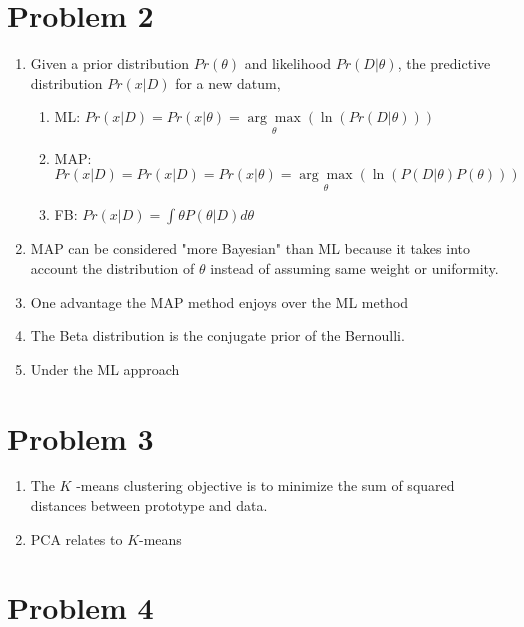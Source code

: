 \documentclass[11pt]{article}
\begin{document}
\section{Problem 2}
\begin{enumerate}
\item Given a prior distribution $Pr(\theta)$ and likelihood $Pr(D|\theta)$, the predictive distribution $Pr(x|D)$ for a new datum, 
	\begin{enumerate}
	\item ML: $Pr(x|D)=Pr(x|\theta)=\underset{\theta}{\arg\max}(\ln(Pr(D|\theta)))$
	\item MAP: $Pr(x|D)=Pr(x|D)=Pr(x|\theta)=\underset{\theta}{\arg\max}(\ln(P(D|\theta)P(\theta)))$
	\item FB: $Pr(x|D)=\int \theta P(\theta|D)d\theta$
	\end{enumerate}
\item MAP can be considered "more Bayesian" than ML because it takes into account the distribution of $\theta$ instead of assuming same weight or uniformity.
\item One advantage the MAP method enjoys over the ML method
\item The Beta distribution is the conjugate prior of the Bernoulli.
\item Under the ML approach
\end{enumerate}

\section{Problem 3}
\begin{enumerate}
\item The $K$ -means clustering objective is to minimize the sum of squared distances between prototype and data.
\item PCA relates to $K$-means
\end{enumerate}

\section{Problem 4}
\end{document}
